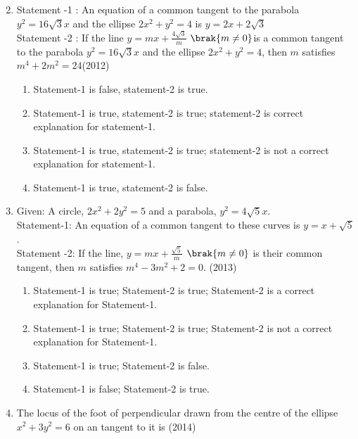 \begin{enumerate}
\begin{multicols}{4}
\begin{enumerate}
\end{enumerate}
\end{multicols}
\item Statement -1 : An equation of a common tangent to the  parabola $y^2=16\sqrt{3}x$ and the ellipse $2x^2+y^2=4$ is $y=2x+2\sqrt{3}$\\
Statement -2 : If the line $y=mx+\frac{4\sqrt{3}}{m}$ $\brak{m \neq 0}$is a common tangent to the parabola $y^2=16\sqrt{3}x$ and the ellipse $2x^2+y^2=4$, then $m$ satisfies $m^4+2m^2=24$\hfill(2012)
\begin{multicols}{2}
\begin{enumerate}
    \item Statement-1 is false, statement-2 is true.
    \item Statement-1 is true,  statement-2 is true; statement-2 is correct explanation for statement-1.
    \item Statement-1 is true, statement-2 is true; statement-2 is not a correct explanation for statement-1.
    \item Statement-1 is true, statement-2 is false.
\end{enumerate}
\end{multicols}
\item {Given: A circle, $2x^2+2y^2=5$ and a parabola, $y^2=4\sqrt{5}x$.\\
Statement-1: An equation of a common tangent to these curves is $y=x+\sqrt{5}$.\\
Statement -2: If the line, $y=mx+\frac{\sqrt{5}}{m}$ $\brak{m \neq 0}$ is their common tangent, then $m$ satisfies $m^4-3m^2+2=0$.}
\hfill(2013)
\begin{multicols}{2}
\begin{enumerate}
    \item Statement-1 is true; Statement-2 is true; Statement-2 is a correct explanation for Statement-1.
    \item Statement-1 is true; Statement-2 is true; Statement-2 is not a correct explanation for Statement-1.
    \item Statement-1 is true; Statement-2 is false.
    \item Statement-1 is false; Statement-2 is true.
\end{enumerate}
\end{multicols}
\item The locus of the foot of perpendicular drawn from the centre of the ellipse $x^2+3y^2=6$ on an tangent to it is
\hfill(2014)
\begin{multicols}{2}

\end{multicols}
\end{enumerate}
